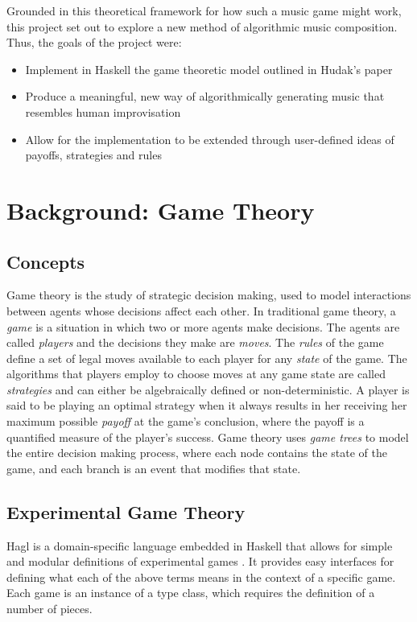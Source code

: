 \documentclass{article}
\begin{document}
Grounded in this theoretical framework for how such a music game might
work, this project set out to explore a new method of algorithmic music
composition. Thus, the goals of the project were:

\begin{itemize}
\itemsep1pt\parskip0pt
\item
  Implement in Haskell the game theoretic model outlined in Hudak's
  paper
\item
  Produce a meaningful, new way of algorithmically generating music that
  resembles human improvisation
\item
  Allow for the implementation to be extended through user-defined ideas
  of payoffs, strategies and rules
\end{itemize}

\section{Background: Game Theory}

\subsection{Concepts}
Game theory is the study of strategic decision making, used to model
interactions between agents whose decisions affect each other. In
traditional game theory, a \emph{game} is a situation in which two or
more agents make decisions. The agents are called \emph{players} and the
decisions they make are \emph{moves}. The \emph{rules} of the game
define a set of legal moves available to each player for any
\emph{state} of the game. The algorithms that players employ to choose
moves at any game state are called \emph{strategies} and can either be
algebraically defined or non-deterministic. A player is said to be
playing an optimal strategy when it always results in her receiving her
maximum possible \emph{payoff} at the game's conclusion, where the
payoff is a quantified measure of the player's success. Game theory uses
\emph{game trees} to model the entire decision making process, where
each node contains the state of the game, and each branch is an event
that modifies that state.

\subsection{Experimental Game Theory}
Hagl is a domain-specific language embedded in Haskell that allows for
simple and modular definitions of experimental games \cite{gametheory, gametheorythesis}. It provides easy interfaces for
defining what each of the above terms means in the context of a specific
game. Each game is an instance of a type class, which requires the
definition of a number of pieces.
\end{document}
